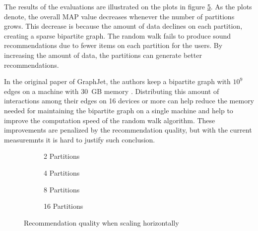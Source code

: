 The results of the evaluations are illustrated on the plots in figure \ref{fig:horizontal-scaling}. As the plots denote, the overall MAP value decreases whenever the number of partitions grows. This decrease is because the amount of data declines on each partition, creating a sparse bipartite graph. The random walk fails to produce sound recommendations due to fewer items on each partition for the users. By increasing the amount of data, the partitions can generate better recommendations. 


In the original paper of GraphJet, the authors keep a bipartite graph with $10^9$ edges on a machine with 30~GB memory \cite{sharmaGraphJetRealtimeContent2016}. Distributing this amount of interactions among their edges on 16 devices or more can help reduce the memory needed for maintaining the bipartite graph on a single machine and help to improve the computation speed of the random walk algorithm. These improvements are penalized by the recommendation quality, but with the current measuremnts it is hard to justify such conclusion.


\begin{figure}[!htb]
	\centering
	\begin{subfigure}[b]{0.5\linewidth}
	  \centering
	  
	  \caption{2 Partitions} 
	  \label{fig:horizontal-scaling-2-partitions-a} 
	  \vspace{1cm}
	\end{subfigure}%
	\begin{subfigure}[b]{0.5\linewidth}
	  \centering
	  
	  \caption{4 Partitions} 
	  \label{fig:horizontal-scaling-4-partitions-b} 
	  \vspace{1cm}
	\end{subfigure} 
	\begin{subfigure}[b]{0.5\linewidth}
	  \centering
	  
	  \caption{8 Partitions} 
	  \label{fig:horizontal-scaling-8-partitions-c} 
	\end{subfigure}%
	\begin{subfigure}[b]{0.5\linewidth}
	  \centering
	  
	  \caption{16 Partitions} 
	  \label{fig:horizontal-scaling-16-partitions-d} 
	\end{subfigure} 
	\caption{Recommendation quality when scaling horizontally}
	\label{fig:horizontal-scaling} 
\end{figure}
